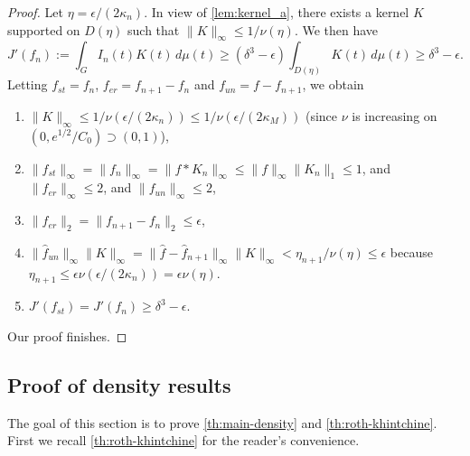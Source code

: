 \documentclass[10pt]{article}
\theoremstyle{definition}
\begin{document}
\begin{proof}
    Let $\eta = \epsilon/(2 \kappa_n)$. In view of \cref{lem:kernel_a}, there exists a kernel $K$ supported on $D(\eta)$ such that $\lVert K \rVert_{\infty} \leq 1/\nu(\eta)$.
    We then have
    \[
        J'(f_{n}) := \int_G I_{n}(t) K(t) \, d \mu(t) \geq (\delta^3 - \epsilon) \int_{D(\eta)} K(t) \, d\mu(t) \geq \delta^3 - \epsilon.
    \]
    Letting $f_{st} = f_n$, $f_{er} = f_{n+1} - f_n$ and $f_{un} = f - f_{n+1}$, we obtain
    \begin{enumerate}
        \item $\lVert K \rVert_{\infty} \leq 1/\nu(\epsilon/(2\kappa_n)) \leq 1/\nu(\epsilon/(2 \kappa_M))$ (since $\nu$ is increasing on $(0, e^{1/2}/C_0) \supset (0, 1)$),

        \item $\lVert f_{st} \rVert_{\infty} = \lVert f_n \rVert_{\infty} = \lVert f * K_n \rVert_{\infty} \leq \lVert f \rVert_{\infty} \lVert K_n \rVert_1 \leq 1$, and $\lVert f_{er} \rVert_{\infty} \leq 2$, and $\lVert f_{un} \rVert_{\infty} \leq 2$,
        
        \item $\lVert f_{er} \rVert_2 = \lVert f_{n+1} - f_n \rVert_2 \leq \epsilon$,
        
        \item $\lVert \hat{f}_{un} \rVert_{\infty} \lVert K \rVert_{\infty} = \lVert \hat{f} - \hat{f}_{n+1} \rVert_{\infty} \lVert K \rVert_{\infty} < \eta_{n+1}/ \nu(\eta) \leq \epsilon$ because $\eta_{n+1} \leq \epsilon \nu(\epsilon/(2\kappa_n)) = \epsilon \nu(\eta).$
        
        \item $J'(f_{st}) = J'(f_n) \geq \delta^3 - \epsilon$.
    \end{enumerate}
    Our proof finishes. 
\end{proof}

\subsection{Proof of density results}
The goal of this section is to prove \cref{th:main-density} and \cref{th:roth-khintchine}. First we recall \cref{th:roth-khintchine} for the reader's convenience.
\end{document}
